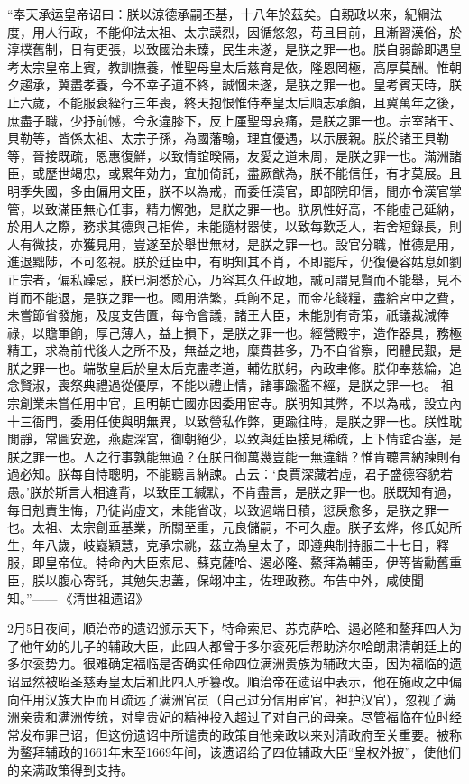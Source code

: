 “奉天承运皇帝诏曰：朕以涼德承嗣丕基，十八年於茲矣。自親政以來，紀綱法度，用人行政，不能仰法太祖、太宗謨烈，因循悠忽，苟且目前，且漸習漢俗，於淳樸舊制，日有更張，以致國治未臻，民生未遂，是朕之罪一也。朕自弱齡即遇皇考太宗皇帝上賓，教訓撫養，惟聖母皇太后慈育是依，隆恩罔極，高厚莫酬。惟朝夕趨承，冀盡孝養，今不幸子道不終，誠悃未遂，是朕之罪一也。皇考賓天時，朕止六歲，不能服衰絰行三年喪，終天抱恨惟侍奉皇太后順志承顏，且冀萬年之後，庶盡子職，少抒前憾，今永違膝下，反上厪聖母哀痛，是朕之罪一也。宗室諸王、貝勒等，皆係太祖、太宗子孫，為國藩翰，理宜優遇，以示展親。朕於諸王貝勒等，晉接既疏，恩惠復鮮，以致情誼暌隔，友愛之道未周，是朕之罪一也。滿洲諸臣，或歷世竭忠，或累年効力，宜加倚託，盡厥猷為，朕不能信任，有才莫展。且明季失國，多由偏用文臣，朕不以為戒，而委任漢官，即部院印信，間亦令漢官掌管，以致滿臣無心任事，精力懈弛，是朕之罪一也。朕夙性好高，不能虛己延納，於用人之際，務求其德與己相侔，未能隨材器使，以致每歎乏人，若舍短錄長，則人有微技，亦獲見用，豈遂至於舉世無材，是朕之罪一也。設官分職，惟德是用，進退黜陟，不可忽視。朕於廷臣中，有明知其不肖，不即罷斥，仍復優容姑息如劉正宗者，偏私躁忌，朕已洞悉於心，乃容其久任政地，誠可謂見賢而不能舉，見不肖而不能退，是朕之罪一也。國用浩繁，兵餉不足，而金花錢糧，盡給宮中之費，未嘗節省發施，及度支告匱，每令會議，諸王大臣，未能別有奇策，祇議裁減俸祿，以贍軍餉，厚己薄人，益上損下，是朕之罪一也。經營殿宇，造作器具，務極精工，求為前代後人之所不及，無益之地，糜費甚多，乃不自省察，罔體民艱，是朕之罪一也。端敬皇后於皇太后克盡孝道，輔佐朕躬，內政聿修。朕仰奉慈綸，追念賢淑，喪祭典禮過從優厚，不能以禮止情，諸事踰濫不經，是朕之罪一也。 祖宗創業未嘗任用中官，且明朝亡國亦因委用宦寺。朕明知其弊，不以為戒，設立內十三衙門，委用任使與明無異，以致營私作弊，更踰往時，是朕之罪一也。朕性耽閒靜，常圖安逸，燕處深宮，御朝絕少，以致與廷臣接見稀疏，上下情誼否塞，是朕之罪一也。人之行事孰能無過？在朕日御萬幾豈能一無違錯？惟肯聽言納諫則有過必知。朕每自恃聰明，不能聽言納諫。古云：‘良賈深藏若虛，君子盛德容貌若愚。’朕於斯言大相違背，以致臣工緘默，不肯盡言，是朕之罪一也。朕既知有過，每日剋責生悔，乃徒尚虛文，未能省改，以致過端日積，愆戾愈多，是朕之罪一也。太祖、太宗創垂基業，所關至重，元良儲嗣，不可久虛。朕子玄烨，佟氏妃所生，年八歲，岐嶷穎慧，克承宗祧，茲立為皇太子，即遵典制持服二十七日，釋服，即皇帝位。特命內大臣索尼、蘇克薩哈、遏必隆、鰲拜為輔臣，伊等皆勳舊重臣，朕以腹心寄託，其勉矢忠藎，保翊冲主，佐理政務。布告中外，咸使聞知。”—— 《清世祖遗诏》

2月5日夜间，順治帝的遗诏颁示天下，特命索尼、苏克萨哈、遏必隆和鳌拜四人为了他年幼的儿子的辅政大臣，此四人都曾于多尔衮死后帮助济尔哈朗肃清朝廷上的多尔衮势力。很难确定福临是否确实任命四位满洲贵族为辅政大臣，因为福临的遗诏显然被昭圣慈寿皇太后和此四人所篡改。順治帝在遗诏中表示，他在施政之中偏向任用汉族大臣而且疏远了满洲官员（自己过分信用宦官，袒护汉官），忽视了满洲亲贵和满洲传统，对皇贵妃的精神投入超过了对自己的母亲。尽管福临在位时经常发布罪己诏，但这份遗诏中所谴责的政策自他亲政以来对清政府至关重要。被称为鳌拜辅政的1661年末至1669年间，该遗诏给了四位辅政大臣“皇权外披”，使他们的亲满政策得到支持。

